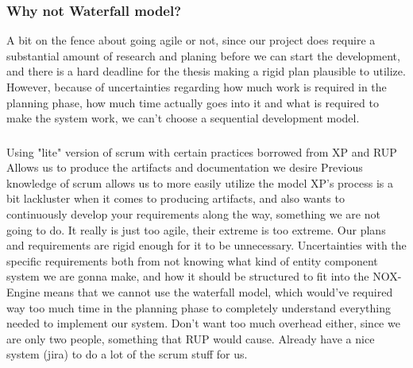 \subsubsection*{Why not Waterfall model?}

A bit on the fence about going agile or not, since our project does require a substantial amount of research and planing before we can start the development, and there is a hard deadline for the thesis making a rigid plan plausible to utilize. 
However, because of uncertainties regarding how much work is required in the planning phase, how much time actually goes into it and what is required to make the system work, we can't choose a sequential development model.


\subsubsection*{}
Using "lite" version of scrum with certain practices borrowed from XP and RUP
Allows us to produce the artifacts and documentation we desire
Previous knowledge of scrum allows us to more easily utilize the model
XP's process is a bit lackluster when it comes to producing artifacts, and also wants to continuously develop your requirements along the way, something we are not going to do. It really is just too agile, their extreme is too extreme. Our plans and requirements are rigid enough for it to be unnecessary.
Uncertainties with the specific requirements both from not knowing what kind of entity component system we are gonna make, and how it should be structured to fit into the NOX-Engine means that we cannot use the waterfall model, which would've required way too much time in the planning phase to completely understand everything needed to implement our system.
Don't want too much overhead either, since we are only two people, something that RUP would cause.
Already have a nice system (jira) to do a lot of the scrum stuff for us.
